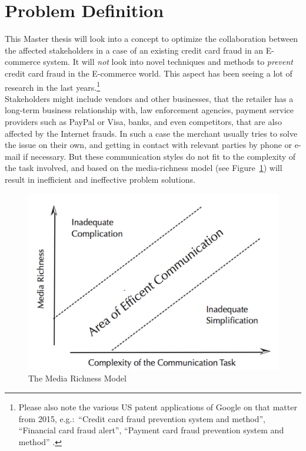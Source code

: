 
\section{Problem Definition}
\label{sec:problem_definition}

This Master thesis will look into a concept to optimize the collaboration between the affected stakeholders in a case of an existing credit card fraud in an \gls{E-commerce} system. It will \emph{not} look into novel techniques and methods to \emph{prevent} credit card fraud in the \gls{E-commerce} world. This aspect has been seeing a lot of research in the last years.\footnote{Please also note the various US patent applications of Google on that matter from 2015, e.g.:\ “Credit card fraud prevention system and method”, “Financial card fraud alert”, “Payment card fraud prevention system and method” \citep{GooglePatents2015}.} \\

Stakeholders might include vendors and other businesses, that the retailer has a long-term business relationship with, law enforcement agencies, payment service providers such as PayPal or Visa, banks, and even competitors, that are also affected by the Internet frauds. In such a case the merchant usually tries to solve the issue on their own, and getting in contact with relevant parties by phone or e-mail if necessary. But these communication styles do not fit to the complexity of the task involved, and based on the media-richness model (see Figure~\ref{fig:images_media_richness_model}) will result in inefficient and ineffective problem solutions. \\

\begin{figure}[!ht]
	\centering
		\includegraphics[width=0.7\columnwidth]{images/media-richness-model.png}
	\caption[The Media Richness Model]{The Media Richness Model \citep{Rice1992}}
\label{fig:images_media_richness_model}
\end{figure}

